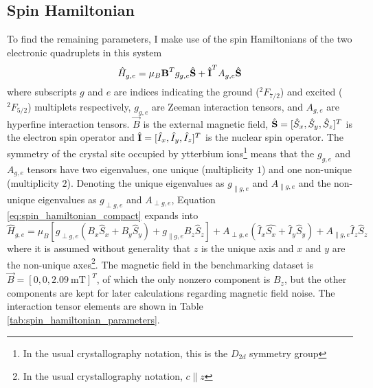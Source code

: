 \subsection{Spin Hamiltonian}
To find the remaining parameters, I make use of the spin Hamiltonians\cite{kindem_characterization_2018} of the two electronic quadruplets in this system
\begin{equation}
    \hat{H}_{g,e} = \mu_B\boldsymbol{\mathbf{B}}^Tg_{g,e}\hat{\boldsymbol{\mathbf{S}}} + \hat{\boldsymbol{\mathbf{I}}}^TA_{g,e}\hat{\boldsymbol{\mathbf{S}}} \label{eq:spin_hamiltonian_compact}
\end{equation}
where subscripts $g$ and $e$ are indices indicating the ground ($^2F_{7/2}$) and excited ($^2F_{5/2}$) multiplets respectively, $g_{g,e}$ are Zeeman interaction tensors, and $A_{g,e}$ are hyperfine interaction tensors. $\vec{B}$ is the external magnetic field, $\hat{\boldsymbol{\mathbf{S}}} = [\hat{S}_x, \hat{S}_y, \hat{S}_z]^T$ is the electron spin operator and $\hat{\boldsymbol{\mathbf{I}}} = [\hat{I}_x, \hat{I}_y, \hat{I}_z]^T$ is the nuclear spin operator. The symmetry of the crystal site occupied by ytterbium ions\footnote{In the usual crystallography notation, this is the $D_{2d}$ symmetry group} means that the $g_{g,e}$ and $A_{g,e}$ tensors have two eigenvalues, one unique (multiplicity $1$) and one non-unique (multiplicity $2$). Denoting the unique eigenvalues as $g_{\parallel g,e}$ and $A_{\parallel g,e}$ and the non-unique eigenvalues as $g_{\perp g,e}$ and $A_{\perp g,e}$, Equation \ref{eq:spin_hamiltonian_compact} expands into
\begin{equation}
    \hat{H}_{g,e} = \mu_B[g_{\perp g,e}(B_x\hat{S}_x + B_y\hat{S}_y) + g_{\parallel g,e}B_z\hat{S}_z] + A_{\perp g,e}(\hat{I}_x\hat{S_x} + \hat{I}_y\hat{S}_y) + A_{\parallel g,e}\hat{I}_z\hat{S}_z \label{eq:spin_hamiltonian_expanded}
\end{equation}
where it is assumed without generality that $z$ is the unique axis and $x$ and $y$ are the non-unique axes\footnote{In the usual crystallography notation, $c\parallel z$}. The magnetic field in the benchmarking dataset is $\vec{B} = [0, 0, \qty{2.09}{\milli\tesla}]^T$, of which the only nonzero component is $B_z$, but the other components are kept for later calculations regarding magnetic field noise. The interaction tensor elements are shown in Table \ref{tab:spin_hamiltonian_parameters}.

